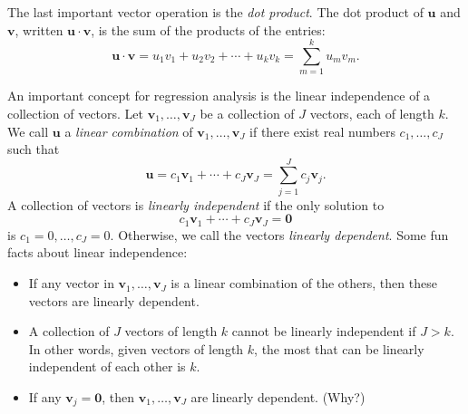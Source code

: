\documentclass[12pt,oneside,openany]{book}
\begin{document}
The last important vector operation is the \emph{dot product}. The dot
product of \(\mathbf{u}\) and \(\mathbf{v}\), written
\(\mathbf{u} \cdot \mathbf{v}\), is the sum of the products of the
entries: \[
\mathbf{u} \cdot \mathbf{v}
=
u_1 v_1 + u_2 v_2 + \cdots + u_k v_k
=
\sum_{m=1}^k u_m v_m.
\]

An important concept for regression analysis is the linear independence
of a collection of vectors. Let \(\mathbf{v}_1, \ldots, \mathbf{v}_J\)
be a collection of \(J\) vectors, each of length \(k\). We call
\(\mathbf{u}\) a \emph{linear combination} of
\(\mathbf{v}_1, \ldots, \mathbf{v}_J\) if there exist real numbers
\(c_1, \ldots, c_J\) such that \[
\mathbf{u} = c_1 \mathbf{v}_1 + \cdots + c_J \mathbf{v}_J = \sum_{j=1}^J c_j \mathbf{v}_j.
\] A collection of vectors is \emph{linearly independent} if the only
solution to \[
c_1 \mathbf{v}_1 + \cdots + c_J \mathbf{v}_J = \mathbf{0}
\] is \(c_1 = 0, \ldots, c_J = 0\). Otherwise, we call the vectors
\emph{linearly dependent}. Some fun facts about linear independence:

\begin{itemize}
\item
  If any vector in \(\mathbf{v}_1, \ldots, \mathbf{v}_J\) is a linear
  combination of the others, then these vectors are linearly dependent.
\item
  A collection of \(J\) vectors of length \(k\) cannot be linearly
  independent if \(J > k\). In other words, given vectors of length
  \(k\), the most that can be linearly independent of each other is
  \(k\).
\item
  If any \(\mathbf{v}_j = \mathbf{0}\), then
  \(\mathbf{v}_1, \ldots, \mathbf{v}_J\) are linearly dependent. (Why?)
\end{itemize}
\end{document}
